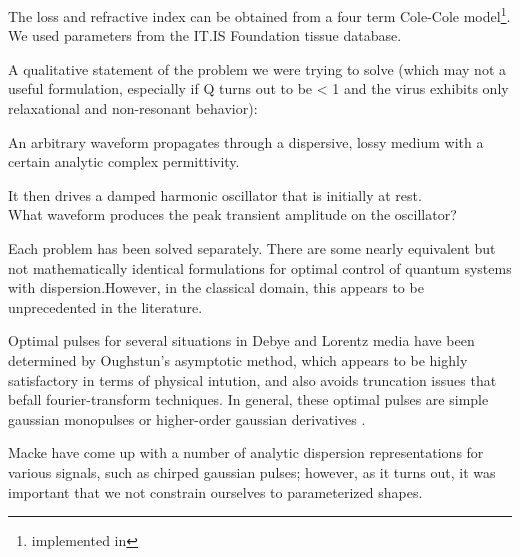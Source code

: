 \documentclass[paper.tex]{subfiles}
\begin{document}
The loss and refractive index can be obtained from a four term Cole-Cole model\cite{gabriel1996compilation}\footnote{implemented in}. We used parameters from the IT.IS Foundation tissue database\cite{Tissue2018a}.


\pagebreak
A qualitative statement of the problem we were trying to solve (which may not a useful formulation, especially if Q turns out to be < 1 and the virus exhibits only relaxational and non-resonant behavior):

\begin{toolchain}
An arbitrary waveform propagates through a dispersive, lossy medium with a certain analytic complex 
permittivity. 

It then drives a damped harmonic oscillator that is initially at rest.\\

What waveform produces the peak transient amplitude on the oscillator?
\end{toolchain}


Each problem has been solved separately. There are some nearly equivalent but not mathematically identical formulations for optimal control of quantum systems with dispersion.\footnotemark However, in the classical domain, this appears to be unprecedented in the literature.



Optimal pulses for several situations in Debye and Lorentz media have been determined by Oughstun's asymptotic method, which appears to be highly satisfactory in terms of physical intution, and also avoids truncation issues that befall fourier-transform techniques. In general, these optimal pulses are simple gaussian monopulses or higher-order gaussian derivatives \cite{Optimal2017} \cite{Optimal2015}. 

Macke \cite{Simple2012} have come up with a number of analytic dispersion representations for various signals, such as chirped gaussian pulses; however, as it turns out, it was important that we not constrain ourselves to parameterized shapes.
\end{document}
